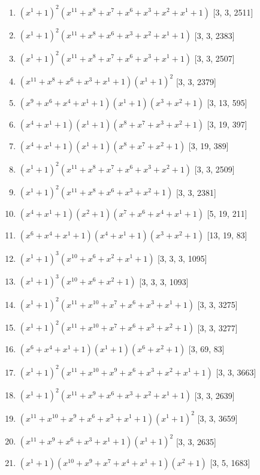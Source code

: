 \documentclass[10pt,twocolumn]{article}
\begin{document}
\begin{enumerate}
\item $(x^{1} + 1)^{2}(x^{11} + x^{8} + x^{7} + x^{6} + x^{3} + x^{2} + x^{1} + 1)$  [3, 3, 2511]
\item $(x^{1} + 1)^{2}(x^{11} + x^{8} + x^{6} + x^{3} + x^{2} + x^{1} + 1)$  [3, 3, 2383]
\item $(x^{1} + 1)^{2}(x^{11} + x^{8} + x^{7} + x^{6} + x^{3} + x^{1} + 1)$  [3, 3, 2507]
\item $(x^{11} + x^{8} + x^{6} + x^{3} + x^{1} + 1)(x^{1} + 1)^{2}$  [3, 3, 2379]
\item $(x^{9} + x^{6} + x^{4} + x^{1} + 1)(x^{1} + 1)(x^{3} + x^{2} + 1)$  [3, 13, 595]
\item $(x^{4} + x^{1} + 1)(x^{1} + 1)(x^{8} + x^{7} + x^{3} + x^{2} + 1)$  [3, 19, 397]
\item $(x^{4} + x^{1} + 1)(x^{1} + 1)(x^{8} + x^{7} + x^{2} + 1)$  [3, 19, 389]
\item $(x^{1} + 1)^{2}(x^{11} + x^{8} + x^{7} + x^{6} + x^{3} + x^{2} + 1)$  [3, 3, 2509]
\item $(x^{1} + 1)^{2}(x^{11} + x^{8} + x^{6} + x^{3} + x^{2} + 1)$  [3, 3, 2381]
\item $(x^{4} + x^{1} + 1)(x^{2} + 1)(x^{7} + x^{6} + x^{4} + x^{1} + 1)$  [5, 19, 211]
\item $(x^{6} + x^{4} + x^{1} + 1)(x^{4} + x^{1} + 1)(x^{3} + x^{2} + 1)$  [13, 19, 83]
\item $(x^{1} + 1)^{3}(x^{10} + x^{6} + x^{2} + x^{1} + 1)$  [3, 3, 3, 1095]
\item $(x^{1} + 1)^{3}(x^{10} + x^{6} + x^{2} + 1)$  [3, 3, 3, 1093]
\item $(x^{1} + 1)^{2}(x^{11} + x^{10} + x^{7} + x^{6} + x^{3} + x^{1} + 1)$  [3, 3, 3275]
\item $(x^{1} + 1)^{2}(x^{11} + x^{10} + x^{7} + x^{6} + x^{3} + x^{2} + 1)$  [3, 3, 3277]
\item $(x^{6} + x^{4} + x^{1} + 1)(x^{1} + 1)(x^{6} + x^{2} + 1)$  [3, 69, 83]
\item $(x^{1} + 1)^{2}(x^{11} + x^{10} + x^{9} + x^{6} + x^{3} + x^{2} + x^{1} + 1)$  [3, 3, 3663]
\item $(x^{1} + 1)^{2}(x^{11} + x^{9} + x^{6} + x^{3} + x^{2} + x^{1} + 1)$  [3, 3, 2639]
\item $(x^{11} + x^{10} + x^{9} + x^{6} + x^{3} + x^{1} + 1)(x^{1} + 1)^{2}$  [3, 3, 3659]
\item $(x^{11} + x^{9} + x^{6} + x^{3} + x^{1} + 1)(x^{1} + 1)^{2}$  [3, 3, 2635]
\item $(x^{1} + 1)(x^{10} + x^{9} + x^{7} + x^{4} + x^{1} + 1)(x^{2} + 1)$  [3, 5, 1683]

\end{enumerate}
\end{document}
